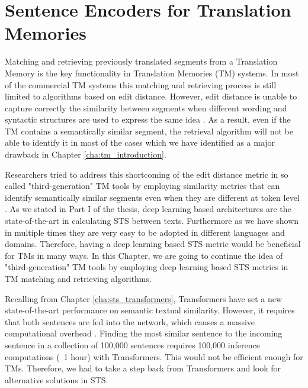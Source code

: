 \chapter{\label{cha:tm_sentence_encoders}Sentence Encoders for Translation Memories}
Matching and retrieving previously translated segments from a Translation Memory is the key functionality in Translation Memories (TM) systems. In most of the commercial TM systems this matching and retrieving process is still limited to algorithms based on edit distance. However, edit distance is unable to capture correctly the similarity between segments when different wording and syntactic structures are used to express the same idea \autocite{mitkov2008improving}. As a result, even if the TM contains a semantically similar segment, the retrieval algorithm will not be able to identify it in most of the cases which we have identified as a major drawback in Chapter \ref{cha:tm_introduction}.

Researchers tried to address this shortcoming of the edit distance metric in so called "third-generation" TM tools by employing similarity metrics that can identify semantically similar segments even when they are different at token level \autocite{pekar2007new}. As we stated in Part I of the thesis, deep learning based architectures are the state-of-the-art in calculating STS between texts. Furthermore as we have shown in multiple times they are very easy to be adopted in different languages and domains. Therefore, having a deep learning based STS metric would be beneficial for TMs in many ways. In this Chapter, we are going to continue the idea of "third-generation" TM tools by employing deep learning based STS metrics in TM matching and retrieving algorithms. 

Recalling from Chapter \ref{cha:sts_transformers}, Transformers have set a new state-of-the-art performance on semantic textual similarity. However, it requires that both sentences are fed into the network, which causes a massive computational overhead \autocite{reimers-gurevych-2019-sentence}. Finding the most similar sentence to the incoming sentence in a collection of 100,000 sentences requires 100,000 inference computations (~1 hour) with Transformers. This would not be efficient enough for TMs. Therefore, we had to take a step back from Transformers and look for alternative solutions in STS. 

